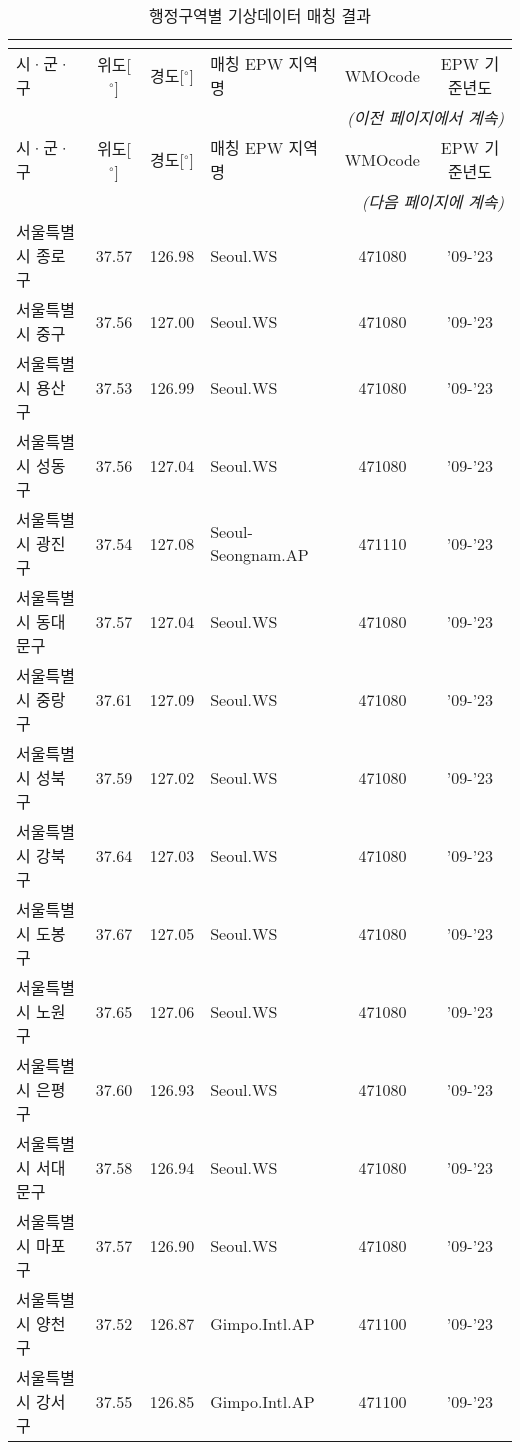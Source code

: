 \begin{longtable}{lcclcc}
  \caption{행정구역별 기상데이터 매칭 결과} \\
  \label{tab:weather_mapping} \\
  \toprule
  \small
  시·군·구 & 위도[$^\circ$] & 경도[$^\circ$] & 매칭 EPW 지역명 & WMOcode & EPW 기준년도 \\ \midrule
  \endfirsthead
  \multicolumn{6}{r}{\textit{(이전 페이지에서 계속)}} \\ \toprule
  시·군·구 & 위도[$^\circ$] & 경도[$^\circ$] & 매칭 EPW 지역명 & WMOcode & EPW 기준년도 \\ \midrule
  \endhead
  \midrule \multicolumn{6}{r}{\textit{(다음 페이지에 계속)}} \\ \bottomrule
  \endfoot
  \bottomrule
  \endlastfoot
  서울특별시 종로구 & 37.57 & 126.98 & Seoul.WS & 471080 & '09-'23 \\
  서울특별시 중구 & 37.56 & 127.00 & Seoul.WS & 471080 & '09-'23 \\
  서울특별시 용산구 & 37.53 & 126.99 & Seoul.WS & 471080 & '09-'23 \\
  서울특별시 성동구 & 37.56 & 127.04 & Seoul.WS & 471080 & '09-'23 \\
  서울특별시 광진구 & 37.54 & 127.08 & Seoul-Seongnam.AP & 471110 & '09-'23 \\
  서울특별시 동대문구 & 37.57 & 127.04 & Seoul.WS & 471080 & '09-'23 \\
  서울특별시 중랑구 & 37.61 & 127.09 & Seoul.WS & 471080 & '09-'23 \\
  서울특별시 성북구 & 37.59 & 127.02 & Seoul.WS & 471080 & '09-'23 \\
  서울특별시 강북구 & 37.64 & 127.03 & Seoul.WS & 471080 & '09-'23 \\
  서울특별시 도봉구 & 37.67 & 127.05 & Seoul.WS & 471080 & '09-'23 \\
  서울특별시 노원구 & 37.65 & 127.06 & Seoul.WS & 471080 & '09-'23 \\
  서울특별시 은평구 & 37.60 & 126.93 & Seoul.WS & 471080 & '09-'23 \\
  서울특별시 서대문구 & 37.58 & 126.94 & Seoul.WS & 471080 & '09-'23 \\
  서울특별시 마포구 & 37.57 & 126.90 & Seoul.WS & 471080 & '09-'23 \\
  서울특별시 양천구 & 37.52 & 126.87 & Gimpo.Intl.AP & 471100 & '09-'23 \\
  서울특별시 강서구 & 37.55 & 126.85 & Gimpo.Intl.AP & 471100 & '09-'23 \\

\end{longtable}

